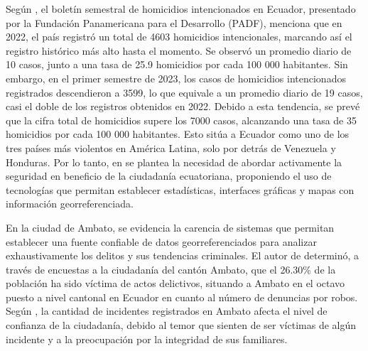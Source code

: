 \bigbreak
Según \cite{tayupantaBOLETINSEMESTRALHOMICIDIOS2023}, el boletín semestral de homicidios intencionados en Ecuador, presentado por la
Fundación Panamericana para el Desarrollo (PADF), menciona que en 2022, el país registró un total de 4603 homicidios intencionales,
marcando así el registro histórico más alto hasta el momento. Se observó un promedio diario de 10 casos, junto a una tasa de 25.9
homicidios por cada 100 000 habitantes. Sin embargo, en el primer semestre de 2023, los casos de homicidios intencionados registrados
descendieron a 3599, lo que equivale a un promedio diario de 19 casos, casi el doble de los registros obtenidos en 2022.
Debido a esta tendencia, se prevé que la cifra total de homicidios supere los 7000 casos, alcanzando una tasa de 35 homicidios por
cada 100 000 habitantes. Esto sitúa a Ecuador como uno de los tres países más violentos en América Latina, solo por detrás de Venezuela y
Honduras. Por lo tanto, en \cite{narvaezGESTIONINFORMACIONCRIMINOLOGICA2018} se plantea la necesidad de abordar activamente la seguridad
en beneficio de la ciudadanía ecuatoriana, proponiendo el uso de tecnologías que permitan establecer estadísticas, interfaces gráficas
y mapas con información georreferenciada.




\bigbreak
En la ciudad de Ambato, se evidencia la carencia de sistemas que permitan establecer una fuente confiable de datos georreferenciados para
analizar exhaustivamente los delitos y sus tendencias criminales. El autor de \cite{alvarezCompendioEconomicoSocial2022} determinó, a
través de encuestas a la ciudadanía del cantón Ambato, que el 26.30\% de la población ha sido víctima de actos delictivos, situando a
Ambato en el octavo puesto a nivel cantonal en Ecuador en cuanto al número de denuncias por robos. Según \cite{quintanaAnalisisSistematicoAumento2023},
la cantidad de incidentes registrados en Ambato afecta el nivel de confianza de la ciudadanía, debido al temor que sienten de ser víctimas
de algún incidente y a la preocupación por la integridad de sus familiares.



